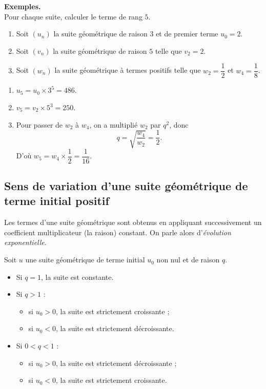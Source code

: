 \documentclass[11pt]{article}
\newenvironment{exemples}{\par\smallskip\noindent\textbf{Exemples. \\}\ignorespaces}{\par\smallskip}
\begin{document}
\begin{exemples}
Pour chaque suite, calculer le terme de rang $5$.
\begin{enumerate}[label=\arabic*.]
    \item Soit $(u_n)$ la suite géométrique de raison $3$ et de premier terme $u_0=2$.
    \item Soit $(v_n)$ la suite géométrique de raison $5$ telle que $v_2=2$.
    \item Soit $(w_n)$ la suite géométrique à termes positifs telle que $w_2=\dfrac12$ et $w_4=\dfrac18$.
\end{enumerate}
\begin{enumerate}[label=\arabic*.]
    \item $u_5=u_0\times 3^5=486$.
    \item $v_5=v_2\times 5^3=250$.
    \item Pour passer de $w_2$ à $w_4$, on a multiplié $w_2$ par $q^2$, donc
    \[
    q=\sqrt{\frac{w_4}{w_2}}=\frac12.
    \]
    D'où $w_5=w_4\times\dfrac12=\dfrac1{16}$.
\end{enumerate}
\end{exemples}

\subsection{Sens de variation d'une suite géométrique de terme initial positif}

Les termes d'une suite géométrique sont obtenus en appliquant successivement un coefficient multiplicateur (la raison) constant. On parle alors d'\emph{évolution exponentielle}.

\begin{propriete}
Soit $u$ une suite géométrique de terme initial $u_0$ non nul et de raison $q$.
\begin{itemize}
    \item Si $q=1$, la suite est constante.
    \item Si $q>1$ :
    \begin{itemize}
        \item si $u_0>0$, la suite est strictement croissante ;
        \item si $u_0<0$, la suite est strictement décroissante.
    \end{itemize}
    \item Si $0<q<1$ :
    \begin{itemize}
        \item si $u_0>0$, la suite est strictement décroissante ;
        \item si $u_0<0$, la suite est strictement croissante.
    \end{itemize}
\end{itemize}
\end{propriete}
\end{document}
